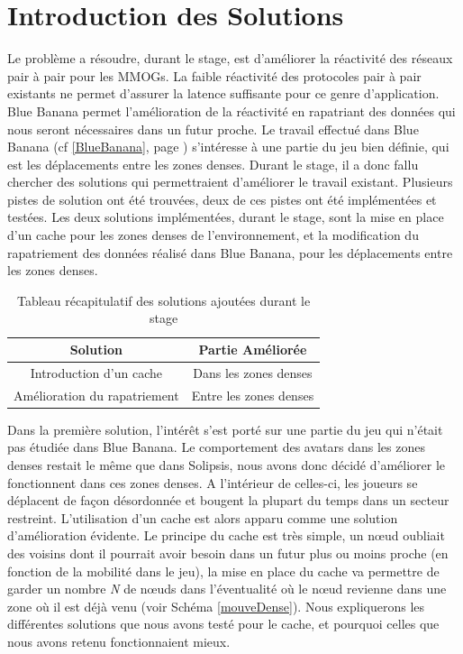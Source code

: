 \section{Introduction des Solutions}
\label{introSolutions}
	Le problème a résoudre, durant le stage, est d'améliorer la réactivité des réseaux pair à pair pour les MMOGs. La faible réactivité des protocoles pair à pair existants ne permet d'assurer la latence suffisante pour ce genre d'application. Blue Banana permet l'amélioration de la réactivité en rapatriant des données qui nous seront nécessaires dans un futur proche. Le travail effectué dans Blue Banana (cf \ref{BlueBanana}, page \pageref{BlueBanana}) s'intéresse à une partie du jeu bien définie, qui est les déplacements entre les zones denses. Durant le stage, il a donc fallu chercher des solutions qui permettraient d'améliorer le travail existant. Plusieurs pistes de solution ont été trouvées, deux de ces pistes ont été implémentées et testées. Les deux solutions implémentées, durant le stage, sont la mise en place d'un cache pour les zones denses de l'environnement, et la modification du rapatriement des données réalisé dans Blue Banana, pour les déplacements entre les zones denses.
\begin{table}[!h]
  \begin{center}
    \begin{tabular}{|c|c|}
      \hline
      Solution & Partie Améliorée \\
      \hline
      Introduction d'un cache  & Dans les zones denses \\
      Amélioration du rapatriement & Entre les zones denses \\
      \hline
    \end{tabular}
  \end{center}
  \label{tab:config2}
  \caption{Tableau récapitulatif des solutions ajoutées durant le stage}
\end{table}
\par Dans la première solution, l'intérêt s'est porté sur une partie du jeu qui n'était pas étudiée dans Blue Banana. Le comportement des avatars dans les zones denses restait le même que dans Solipsis, nous avons donc décidé d'améliorer le fonctionnent dans ces zones denses. A l'intérieur de celles-ci, les joueurs se déplacent de façon désordonnée et bougent la plupart du temps dans un secteur restreint. L'utilisation d'un cache est alors apparu comme une solution d'amélioration évidente. Le principe du cache est très simple, un nœud oubliait des voisins dont il pourrait avoir besoin dans un futur plus ou moins proche (en fonction de la mobilité dans le jeu), la mise en place du cache va permettre de garder un nombre \textit{N} de nœuds dans l'éventualité où le nœud revienne dans une zone où il est déjà venu (voir Schéma \ref{mouveDense}). Nous expliquerons les différentes solutions que nous avons testé pour le cache, et pourquoi celles que nous avons retenu fonctionnaient mieux.
